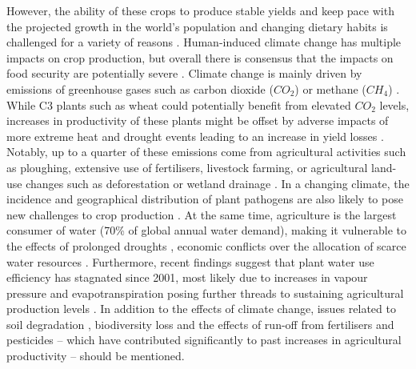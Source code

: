 However, the ability of these crops to produce stable yields and keep pace with the projected growth in the world's population and changing dietary habits is challenged for a variety of reasons \citep{tilman_global_2011}. Human-induced climate change has multiple impacts on crop production, but overall there is consensus that the impacts on food security are potentially severe \citep{schmidhuber_global_2007,godfray_food_2010,rezaei_climate_2023}. Climate change is mainly driven by emissions of greenhouse gases such as carbon dioxide ($CO_2$) or methane ($CH_4$) \citep{ipcc_summary_2023}. While C3 plants such as wheat could potentially benefit from elevated $CO_2$ levels, increases in productivity of these plants might be offset by adverse impacts of more extreme heat and drought events leading to an increase in yield losses \citep{rezaei_climate_2023}. Notably, up to a quarter of these emissions come from agricultural activities such as ploughing, extensive use of fertilisers, livestock farming, or agricultural land-use changes such as deforestation or wetland drainage \citep{laborde_agricultural_2021}. In a changing climate, the incidence and geographical distribution of plant pathogens are also likely to pose new challenges to crop production \citep{burdon_climate_2020}. At the same time, agriculture is the largest consumer of water (70\% of global annual water demand), making it vulnerable to the effects of prolonged droughts \citep{meza_global-scale_2020}, economic conflicts over the allocation of scarce water resources \citep{rosa_global_2020}. Furthermore, recent findings suggest that plant water use efficiency has stagnated since 2001, most likely due to increases in vapour pressure and evapotranspiration posing further threads to sustaining agricultural production levels \citep{li_global_2023}. In addition to the effects of climate change, issues related to soil degradation \citep{bindraban_assessing_2012}, biodiversity loss \citep{lanz_expansion_2018, abdi_biodiversity_2021} and the effects of run-off from fertilisers and pesticides -- which have contributed significantly to past increases in agricultural productivity \citep{pingali_green_2012} -- should be mentioned.

